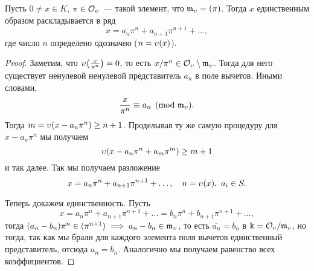 	\begin{theorem}\label{ant_2_thm_2}
		Пусть $0 \neq x \in K$, $\pi \in \mathcal{O}_{\upsilon}$~--- такой элемент, что $\mathfrak{m}_{\upsilon} = (\pi)$. Тогда $x$ единственным образом раскладывается в ряд 
		\[
			x = a_n \pi^n + a_{n + 1} \pi^{n + 1} + \ldots,
		\]
		где число $n$ определено одозначно ($n = \upsilon(x)$). 
	\end{theorem}
	\begin{proof}
		Заметим, что $\v\lr*{\frac{x}{\pi^n}} = 0$, то есть $x/\pi^n \in \mathcal{O}_{\upsilon} \setminus \mathfrak{m}_{\upsilon}$. Тогда для него существует ненулевой  ненулевой представитель $a_n$ в поле вычетов. Иными словами, 
		\[
			\frac{x}{\pi^n} \equiv a_n \pmod{\mathfrak{m}_{\upsilon}}. 
		\]
		Тогда $m = \upsilon(x - a_n\pi^n) \ge n + 1$. Проделывая ту же самую процедуру для $x - a_n\pi^n$ мы получаем
		\[
		 	\upsilon(x - a_n \pi^n + a_m \pi^m) \ge m + 1
		 \] 
		 и так далее. Так мы получаем разложение 
		 \[
		 	x = a_n \pi^n + a_{n + 1}\pi^{n + 1} + \ldots, \quad n = \upsilon(x), \ a_i \in S.
		 \]

		 Теперь докажем единственность. Пусть 
		 \[
		 	x = a_n \pi^n + a_{n + 1}\pi^{n + 1} + \ldots = b_n \pi^n + b_{n + 1}\pi^{n + 1} + \ldots,
		 \]
		 тогда $(a_n - b_n)\pi^{n} \in  (\pi^{n + 1}) \implies a_n - b_n \in \mathfrak{m}_{\upsilon}$, то есть 
		 $\overline{a_n} = \overline{b_n}$ в $\Bbbk = \mathcal{O}_{\upsilon}/\mathfrak{m}_{\upsilon}$, но тогда, так как мы брали для каждого элемента поля вычетов единственный представитель, отсюда $a_n = b_n$. Аналогично мы получаем равенство всех коэффициентов. 
	\end{proof}

